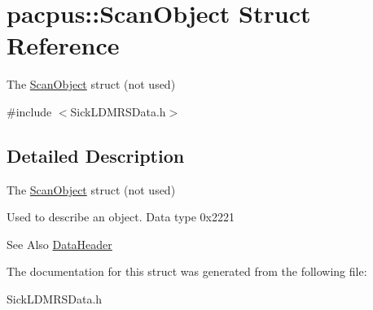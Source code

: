 \hypertarget{structpacpus_1_1ScanObject}{\section{pacpus\-:\-:Scan\-Object Struct Reference}
\label{structpacpus_1_1ScanObject}
}


The \hyperlink{structpacpus_1_1ScanObject}{Scan\-Object} struct (not used)  




{\ttfamily \#include $<$Sick\-L\-D\-M\-R\-S\-Data.\-h$>$}



\subsection{Detailed Description}
The \hyperlink{structpacpus_1_1ScanObject}{Scan\-Object} struct (not used) 

Used to describe an object. Data type 0x2221 \begin{DoxySeeAlso}{See Also}
\hyperlink{structpacpus_1_1DataHeader}{Data\-Header} 
\end{DoxySeeAlso}


The documentation for this struct was generated from the following file\-:\begin{DoxyCompactItemize}
\item 
Sick\-L\-D\-M\-R\-S\-Data.\-h\end{DoxyCompactItemize}
